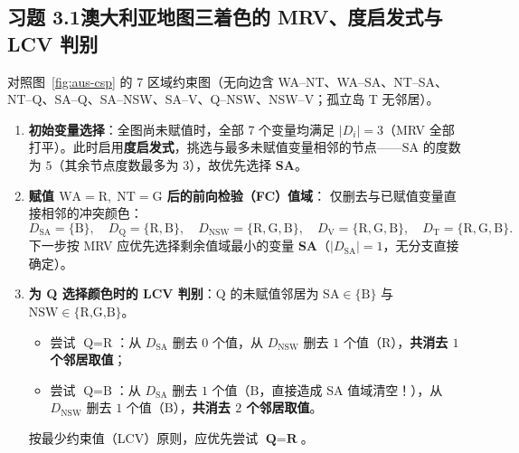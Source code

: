 \subsection*{习题 3.1\quad 澳大利亚地图三着色的 MRV、度启发式与 LCV 判别}
对照图~\ref{fig:aus-csp} 的 7 区域约束图（无向边含 WA--NT、WA--SA、NT--SA、NT--Q、SA--Q、SA--NSW、SA--V、Q--NSW、NSW--V；孤立岛 T 无邻居）。
\begin{enumerate}[label=(\arabic*), leftmargin=1.8em]
  \item \textbf{初始变量选择}：全图尚未赋值时，全部 7 个变量均满足 $|D_i| = 3$（MRV 全部打平）。此时启用\textbf{度启发式}，挑选与最多未赋值变量相邻的节点——$\text{SA}$ 的度数为 $5$（其余节点度数最多为 $3$），故优先选择 \textbf{\textsf{SA}}。
  \item \textbf{赋值 $\text{WA}=\text{R},\; \text{NT}=\text{G}$ 后的前向检验（FC）值域}：
  仅删去与已赋值变量直接相邻的冲突颜色：
  \[
    D_{\text{SA}} = \{\text{B}\},\quad
    D_{\text{Q}} = \{\text{R}, \text{B}\},\quad
    D_{\text{NSW}} = \{\text{R}, \text{G}, \text{B}\},\quad
    D_{\text{V}} = \{\text{R}, \text{G}, \text{B}\},\quad
    D_{\text{T}} = \{\text{R}, \text{G}, \text{B}\}.
  \]
  下一步按 MRV 应优先选择剩余值域最小的变量 \textbf{\textsf{SA}}（$|D_{\text{SA}}| = 1$，无分支直接确定）。
  \item \textbf{为 \textsf{Q} 选择颜色时的 LCV 判别}：\textsf{Q} 的未赋值邻居为 $\text{SA}\in\{\text{B}\}$ 与 $\text{NSW}\in\{\text{R,G,B}\}$。
  \begin{itemize}
    \item 尝试 $\text{Q}=\text{R}$：从 $D_{\text{SA}}$ 删去 $0$ 个值，从 $D_{\text{NSW}}$ 删去 $1$ 个值（$\text{R}$），\textbf{共消去 $1$ 个邻居取值}；
    \item 尝试 $\text{Q}=\text{B}$：从 $D_{\text{SA}}$ 删去 $1$ 个值（$\text{B}$，直接造成 \textsf{SA} 值域清空！），从 $D_{\text{NSW}}$ 删去 $1$ 个值（$\text{B}$），\textbf{共消去 $2$ 个邻居取值}。
  \end{itemize}
  按最少约束值（LCV）原则，应优先尝试 $\mathbf{\text{Q} = \text{R}}$。
\end{enumerate}

